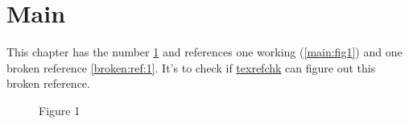 \documentclass[
  fontsize=12pt,%
  DIV=14
]{scrreprt}
\begin{document}
	\chapter{Main}\label{main}
		This chapter has the number \ref{main} and references one working (\autoref{main:fig1}) and one broken reference \autoref{broken:ref:1}. It's to check if \href{https://github.com/akaeba/texrefchk}{texrefchk} can figure out this broken reference.
	
		\begin{figure}[!ht]
			\caption{Figure 1}
			\label{main:fig1}
		\end{figure}
\end{document}
